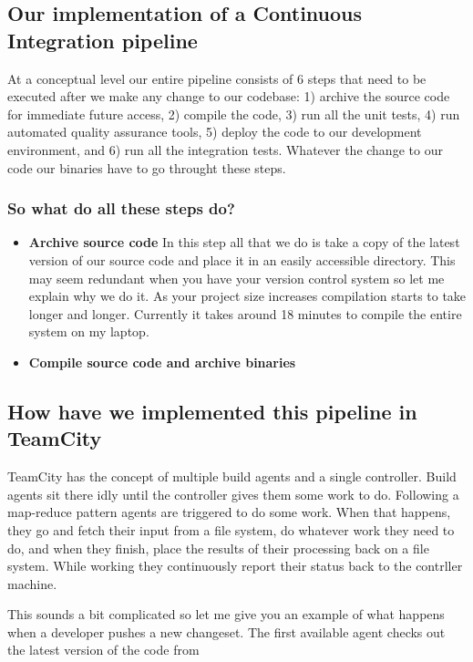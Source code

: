 \documentclass{article}
\begin{document}
\subsection{Our implementation of a Continuous Integration pipeline}

At a conceptual level our entire pipeline consists of 6 steps that
need to be executed after we make any change to our codebase: 1)
archive the source code for immediate future access, 2) compile the
code, 3) run all the unit tests, 4) run automated quality assurance
tools, 5) deploy the code to our development environment, and 6) run
all the integration tests.
%
Whatever the change to our code our binaries have to go throught these
steps.

\subsubsection*{So what do all these steps do?}
\begin{itemize}
  \item \textbf{Archive source code} 
%
In this step all that we do is take a copy of the latest version of
our source code and place it in an easily accessible directory.
%
This may seem redundant when you have your version control system so
let me explain why we do it.
%
As your project size increases compilation starts to take longer and
longer.
%
Currently it takes around 18 minutes to compile the entire system on
my laptop.

  \item \textbf{Compile source code and archive binaries}
%

\end{itemize}

\subsection{How have we implemented this pipeline in TeamCity}
TeamCity has the concept of multiple build agents and a single
controller.
%
Build agents sit there idly until the controller gives them some work
to do.
%
Following a map-reduce pattern agents are triggered to do some work.
%
When that happens, they go and fetch their input from a file system,
do whatever work they need to do, and when they finish, place the
results of their processing back on a file system.
%
While working they continuously report their status back to the
contrller machine.

This sounds a bit complicated so let me give you an example of what
happens when a developer pushes a new changeset.
%
The first available agent checks out the latest version of the code
from 
\end{document}
